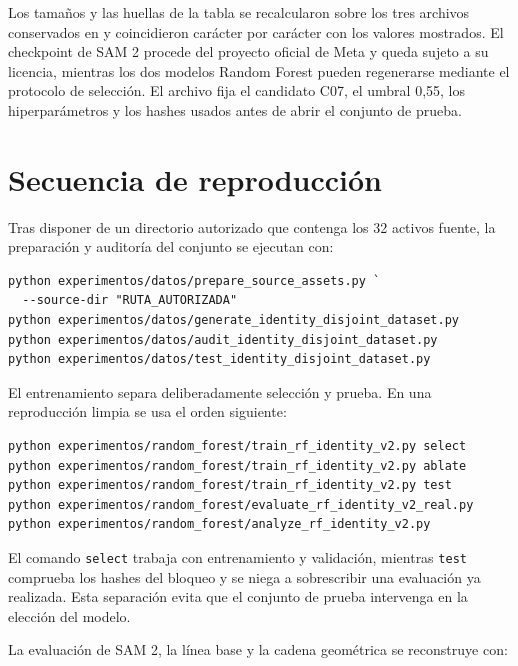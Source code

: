 Los tamaños y las huellas de la tabla se recalcularon sobre los tres archivos conservados en  y coincidieron carácter por carácter con los valores mostrados. El checkpoint de SAM 2 procede del proyecto oficial de Meta y queda sujeto a su licencia, mientras los dos modelos Random Forest pueden regenerarse mediante el protocolo de selección. El archivo  fija el candidato C07, el umbral 0,55, los hiperparámetros y los hashes usados antes de abrir el conjunto de prueba.

\section{Secuencia de reproducción}

Tras disponer de un directorio autorizado que contenga los 32 activos fuente, la preparación y auditoría del conjunto se ejecutan con:

\begin{verbatim}
python experimentos/datos/prepare_source_assets.py `
  --source-dir "RUTA_AUTORIZADA"
python experimentos/datos/generate_identity_disjoint_dataset.py
python experimentos/datos/audit_identity_disjoint_dataset.py
python experimentos/datos/test_identity_disjoint_dataset.py
\end{verbatim}

El entrenamiento separa deliberadamente selección y prueba. En una reproducción limpia se usa el orden siguiente:

\begin{verbatim}
python experimentos/random_forest/train_rf_identity_v2.py select
python experimentos/random_forest/train_rf_identity_v2.py ablate
python experimentos/random_forest/train_rf_identity_v2.py test
python experimentos/random_forest/evaluate_rf_identity_v2_real.py
python experimentos/random_forest/analyze_rf_identity_v2.py
\end{verbatim}

El comando \texttt{select} trabaja con entrenamiento y validación, mientras \texttt{test} comprueba los hashes del bloqueo y se niega a sobrescribir una evaluación ya realizada. Esta separación evita que el conjunto de prueba intervenga en la elección del modelo.

La evaluación de SAM 2, la línea base y la cadena geométrica se reconstruye con:

